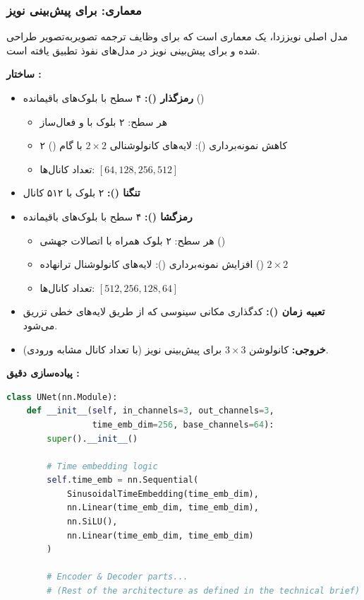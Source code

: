 \subsubsection{معماری:  برای پیش‌بینی نویز}
مدل اصلی نویززدا، یک معماری  است که برای وظایف ترجمه تصویر‌به‌تصویر طراحی شده و برای پیش‌بینی نویز در مدل‌های نفوذ تطبیق یافته است.



\textbf{ساختار :}
\begin{itemize}
    \item \textbf{رمزگذار ():} ۴ سطح با بلوک‌های باقیمانده ()
        \begin{itemize}
            \item هر سطح: ۲ بلوک  با  و فعال‌ساز 
            \item کاهش نمونه‌برداری (): لایه‌های کانولوشنالی $2 \times 2$ با گام () ۲
            \item تعداد کانال‌ها: $[64, 128, 256, 512]$
        \end{itemize}
    \item \textbf{تنگنا ():} ۲ بلوک  با ۵۱۲ کانال
    \item \textbf{رمزگشا ():} ۴ سطح با بلوک‌های باقیمانده
        \begin{itemize}
            \item هر سطح: ۲ بلوک  همراه با اتصالات جهشی ()
            \item افزایش نمونه‌برداری (): لایه‌های کانولوشنال ترانهاده () $2 \times 2$
            \item تعداد کانال‌ها: $[512, 256, 128, 64]$
        \end{itemize}
    \item \textbf{تعبیه زمان ():} کدگذاری مکانی سینوسی که از طریق لایه‌های خطی تزریق می‌شود.
    \item \textbf{خروجی:} کانولوشن $3 \times 3$ برای پیش‌بینی نویز (با تعداد کانال مشابه ورودی).
\end{itemize}



\textbf{پیاده‌سازی دقیق :}
\begin{latin}
\begin{lstlisting}[language=Python]
class UNet(nn.Module):
    def __init__(self, in_channels=3, out_channels=3, 
                 time_emb_dim=256, base_channels=64):
        super().__init__()
        
        # Time embedding logic
        self.time_emb = nn.Sequential(
            SinusoidalTimeEmbedding(time_emb_dim),
            nn.Linear(time_emb_dim, time_emb_dim),
            nn.SiLU(),
            nn.Linear(time_emb_dim, time_emb_dim)
        )
        
        # Encoder & Decoder parts...
        # (Rest of the architecture as defined in the technical brief)
\end{lstlisting}
\end{latin}

